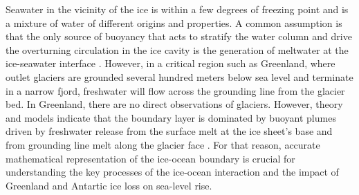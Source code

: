 \documentclass[11pt,a4paper]{article}
\begin{document}
	Seawater in the vicinity of the ice is within a few degrees of freezing point and is a mixture of water of different origins and properties.  A common assumption is that the only source of buoyancy that acts to stratify the water column and drive the overturning circulation in the ice cavity is the generation of meltwater at the ice-seawater interface \citep{jenkins2011convection}. However, in a critical region such as Greenland, where outlet glaciers are grounded several hundred meters below sea level and terminate in a narrow fjord, freshwater will flow across the grounding line from the glacier bed. In Greenland, there are no direct observations of glaciers. However, theory and models indicate that the boundary layer is dominated by buoyant plumes driven by freshwater release from the surface melt at the ice sheet's base and from grounding line melt along the glacier face \citep{jenkins2011convection,straneo2013north}. For that reason, accurate mathematical representation of the ice-ocean boundary is crucial for understanding the key processes of the ice-ocean interaction and the impact of Greenland and Antartic ice loss on sea-level rise. 
	
\end{document}

